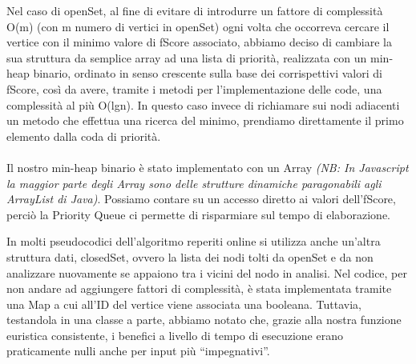 \documentclass[12pt,a4paper]{report}
\begin{document}
Nel caso di openSet, al fine di evitare di introdurre un fattore di complessità O(m) (con m numero di vertici in openSet) ogni volta che occorreva cercare il vertice con il minimo valore di fScore associato, abbiamo deciso di cambiare la sua struttura da semplice array ad una lista di priorità, realizzata con un min-heap binario, ordinato in senso crescente sulla base dei corrispettivi valori di fScore, così da avere, tramite i metodi per l'implementazione delle code, una complessità al più O(lgn). 
In questo caso invece di richiamare sui nodi adiacenti un metodo che effettua una ricerca del minimo, prendiamo direttamente il primo elemento dalla coda di priorità.\\ \\ Il nostro min-heap binario è stato implementato con un Array \emph{(NB: In Javascript la maggior parte degli Array sono delle strutture dinamiche paragonabili agli ArrayList di Java)}. Possiamo contare su un accesso diretto ai valori dell'fScore, perciò la Priority Queue ci permette di risparmiare sul tempo di elaborazione.


In molti pseudocodici dell'algoritmo reperiti online si utilizza anche un'altra struttura dati, closedSet, ovvero la lista dei nodi tolti da openSet e da non analizzare nuovamente se appaiono tra i vicini del nodo in analisi. Nel codice, per non andare ad aggiungere fattori di complessità, è stata implementata tramite una Map a cui all'ID del vertice viene associata una booleana. Tuttavia, testandola in una classe a parte, abbiamo notato che, grazie alla nostra funzione euristica consistente, i benefici a livello di tempo di esecuzione erano praticamente nulli anche per input più “impegnativi”. 
\end{document}
